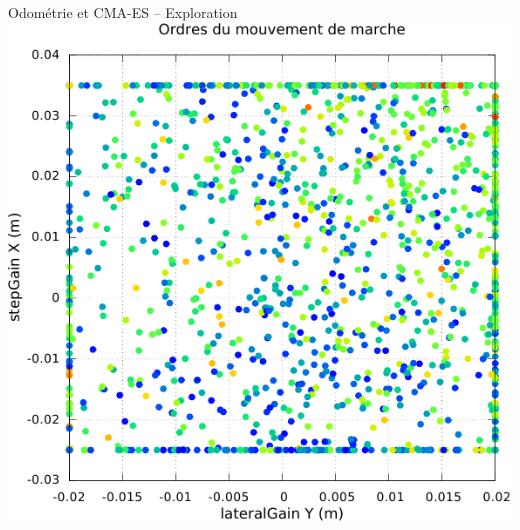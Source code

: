 \begin{frame}[noframenumbering]{Odométrie et CMA-ES -- Exploration}
    \centering
    \includegraphics[type=pdf,ext=.pdf,read=.pdf,width=0.65\linewidth]{../plot/OdometryCMAES/walk_orders}
\end{frame}

